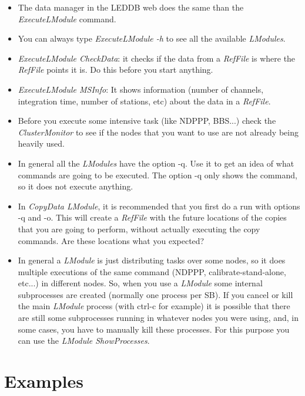 \documentclass[a4paper,11pt]{article}
\begin{document}
\begin{itemize}
\item The data manager in the LEDDB web does the same than the \textit{ExecuteLModule} command.

\item You can always type \textit{ExecuteLModule -h} to see all the available \textit{LModules}.

\item \textit{ExecuteLModule CheckData}: it checks if the data from a \textit{RefFile} is where the \textit{RefFile} points it is. Do this before you start anything.

\item \textit{ExecuteLModule MSInfo}: It shows information (number of channels, integration time, number of stations, etc) about the data in a \textit{RefFile}. 

\item Before you execute some intensive task (like NDPPP, BBS...) check the \textit{ClusterMonitor} to see if the nodes that you want to use are not already being heavily used.

\item In general all the \textit{LModules} have the option -q. Use it to get an idea of what commands are going to be executed. The option -q only shows the command, so it does not execute anything.

\item In \textit{CopyData LModule}, it is recommended that you first do a run with options -q and -o. This will create a \textit{RefFile} with the future locations of the copies that you are going to perform, without actually executing the copy commands. Are these locations what you expected?

\item In general a \textit{LModule} is just distributing tasks over some nodes, so it does multiple executions of the same command (NDPPP, calibrate-stand-alone, etc...) in different nodes. So, when you use a \textit{LModule} some internal subprocesses are created (normally one process per SB). If you cancel or kill the main \textit{LModule} process (with ctrl-c for example) it is possible that there are still some subprocesses running in whatever nodes you were using, and, in some cases, you have to manually kill these processes. For this purpose you can use the \textit{LModule ShowProcesses}.

\end{itemize}

\section{Examples}
\end{document}
